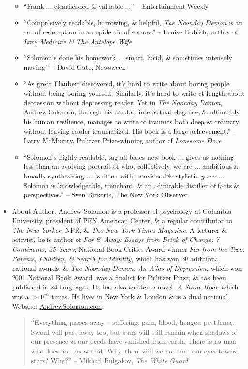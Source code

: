 \documentclass{article}
\begin{document}
\begin{itemize}
\begin{itemize}
		\item ``Frank $\ldots$ clearheaded \& valuable $\ldots$'' --  Entertainment Weekly
		\item ``Compulsively readable, harrowing, \& helpful, {\it The Noonday Demon} is an act of redemption in an epidemic of sorrow.'' -- {\sc Louise Erdrich}, author of {\it Love Medicine \& The Antelope Wife}
		\item ``{\sc Solomon}'s done his homework $\ldots$ smart, lucid, \& sometimes intensely moving.'' -- {\sc David Gate}, Newsweek
		\item ``As great {\sc Flaubert} discovered, it's hard to write about boring people without being boring yourself. Similarly, it's hard to write at length about depression without depressing reader. Yet in {\it The Noonday Demon}, {\sc Andrew Solomon}, through his candor, intellectual elegance, \& ultimately his human resilience, manages to write of traumas both deep \& ordinary without leaving reader traumatized. His book is a large achievement.'' -- {\sc Larry McMurtry}, Pulitzer Prize-winning author of {\it Lonesome Dove}
		\item ``{\sc Solomon}'s highly readable, tag-all-bases new book $\ldots$ gives us nothing less than an evolving portrait of who, collectively, we are $\ldots$ ambitious \& broadly synthesizing $\ldots$ [written with] considerable stylistic grace $\ldots$ {\sc Solomon} is knowledgeable, trenchant, \& an admirable distiller of facts \& perspectives.'' -- {\sc Sven Birkerts}, The New York Observer
	\end{itemize}
	\item {\sf About Author.} {\sc Andrew Solomon}  is a professor of psychology at Columbia University, president of PEN American Center, \& a regular contributor to {\it The New Yorker}, NPR, \& {\it The New York Times Magazine}. A lecturer \& activist, he is author of {\it Far \& Away: Essays from Brink of Change: 7 Continents, 25 Years}; National Book Critics Award-winner {\it Far from the Tree: Parents, Children, \& Search for Identity}, which has won 30 additional national awards; \& {\it The Noonday Demon: An Atlas of Depression}, which won 2001 National Book Award, was a finalist for Pulitzer Prize, \& has been published in 24 languages. He has also written a novel, {\it A Stone Boat}, which was a $> 10^6$ times. He lives in New York \& London \& is a dual national. Website: \url{AndrewSolomon.com}.
	\begin{quote}
		``Everything passes away -- suffering, pain, blood, hunger, pestilence. Sword will pass away too, but stars will still remain when shadows of our presence \& our deeds have vanished from earth. There is no man who does not know that. Why, then, will we not turn our eyes toward stars? Why?'' -- {\sc Mikhail Bulgakov}, {\it The White Guard}

\end{quote}
\end{itemize}
\end{document}
